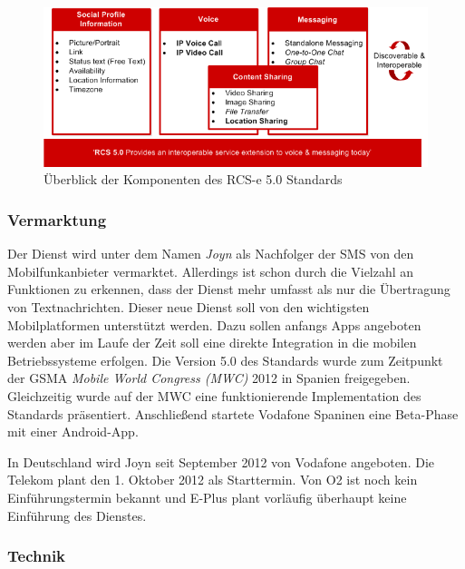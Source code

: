\documentclass[german,12pt,a4paper]{article}
\begin{document}
 \begin{figure}
     \centering
     \includegraphics[width=\textwidth]{img/rcs-e-overview}
     \caption{Überblick der Komponenten des RCS-e 5.0 Standards \cite{rcs:spec}}
     \label{fig:rcs-e-overview}
 \end{figure}

  \subsubsection{Vermarktung} %
  \label{ssub:vermarktung}

  Der Dienst wird unter dem Namen \textit{Joyn} als \glqq{}Nachfolger der
  SMS\grqq{} von den Mobilfunkanbieter vermarktet. Allerdings ist schon durch die Vielzahl an
  Funktionen zu erkennen, dass der Dienst mehr umfasst als nur die
  Übertragung von Textnachrichten. Dieser neue Dienst soll von den wichtigsten
  Mobilplatformen unterstützt werden. Dazu sollen anfangs Apps angeboten werden aber im Laufe der
  Zeit soll eine direkte Integration in die mobilen Betriebssysteme erfolgen. Die Version 5.0
  des Standards wurde zum Zeitpunkt der GSMA \textit{Mobile World
      Congress (MWC)} 2012 in Spanien freigegeben. Gleichzeitig wurde auf der MWC eine
  funktionierende Implementation des Standards präsentiert. Anschließend startete Vodafone Spaninen
  eine Beta-Phase mit einer Android-App.

  In Deutschland wird Joyn seit September 2012 von Vodafone angeboten. Die Telekom plant den
  1. Oktober 2012 als Starttermin. Von O2 ist noch kein Einführungstermin bekannt
  und E-Plus plant vorläufig überhaupt keine Einführung des Dienstes.


  \subsubsection{Technik} %
  \label{ssub:technik}
\end{document}
